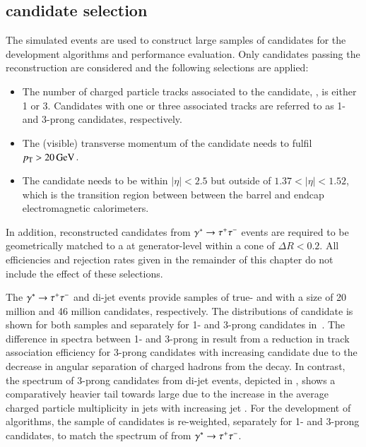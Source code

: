 \subsection{\tauhadvis candidate selection}

The simulated events are used to construct large samples of \tauhadvis
candidates for the development \tauid algorithms and performance
evaluation. Only \tauhadvis candidates passing the reconstruction are
considered and the following selections are applied:
\begin{itemize}

\item The number of charged particle tracks associated to the
  \tauhadvis candidate, \Ntracks, is either 1 or 3. Candidates with
  one or three associated tracks are referred to as 1- and 3-prong
  \tauhadvis candidates, respectively.

\item The (visible) transverse momentum of the candidate needs to
  fulfil $\pT > \SI{20}{\GeV}$.

\item The \tauhadvis candidate needs to be within $|\eta| < 2.5$ but
  outside of $1.37 < |\eta| < 1.52$, which is the transition region
  between between the barrel and endcap electromagnetic calorimeters.

\end{itemize}
In addition, reconstructed \tauhadvis candidates from
$\gamma^{*} \to \tau^{+} \tau^{-}$ events are required to be geometrically
matched to a \tauhad at generator-level within a cone of
$\Delta R < 0.2$.
All efficiencies and rejection rates given in the remainder of this
chapter do not include the effect of these selections.

The $\gamma^{*} \to \tau^{+} \tau^{-}$ and di-jet events provide samples of
true- and \faketauhadvis with a size of 20 million and 46 million
candidates, respectively. The distributions of \tauhadvis candidate
\pT is shown for both samples and separately for 1- and 3-prong
candidates in~. The difference in \pT
spectra between 1- and 3-prong \truetauhadvis in
 result from a reduction in
track association efficiency for 3-prong \tauhadvis candidates with
increasing candidate \pT due to the decrease in angular separation of
charged hadrons from the \taulepton decay. In contrast, the \pT
spectrum of 3-prong \tauhadvis candidates from di-jet events, depicted
in , shows a comparatively heavier
tail towards large \pT due to the increase in the average charged
particle multiplicity in jets with increasing jet \pT. For the
development of \tauid algorithms, the sample of \faketauhadvis
candidates is re-weighted, separately for 1- and 3-prong candidates,
to match the \pT spectrum of \truetauhadvis from
$\gamma^{*} \to \tau^{+} \tau^{-}$.

